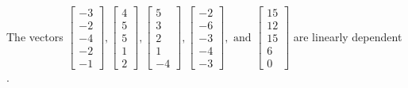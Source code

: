 \begin{exercise}
\begin{exerciseStatement}
  \end{exerciseStatement}
  \begin{exerciseAnswer}
   The vectors \(\left[\begin{array}{r}
-3 \\
-2 \\
-4 \\
-2 \\
-1
\end{array}\right] , \left[\begin{array}{r}
4 \\
5 \\
5 \\
1 \\
2
\end{array}\right] , \left[\begin{array}{r}
5 \\
3 \\
2 \\
1 \\
-4
\end{array}\right] , \left[\begin{array}{r}
-2 \\
-6 \\
-3 \\
-4 \\
-3
\end{array}\right] , \text{ and } \left[\begin{array}{r}
15 \\
12 \\
15 \\
6 \\
0
\end{array}\right]\) are 
  	 linearly dependent  .
  


  \end{exerciseAnswer}
\end{exercise}